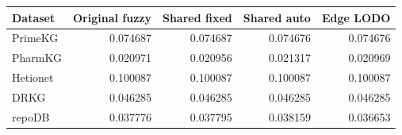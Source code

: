 \begin{tabular}{lrrrr}
\toprule
Dataset & Original fuzzy & Shared fixed & Shared auto & Edge LODO \\
\midrule
PrimeKG & 0.074687 & 0.074687 & 0.074676 & 0.074676 \\
PharmKG & 0.020971 & 0.020956 & 0.021317 & 0.020969 \\
Hetionet & 0.100087 & 0.100087 & 0.100087 & 0.100087 \\
DRKG & 0.046285 & 0.046285 & 0.046285 & 0.046285 \\
repoDB & 0.037776 & 0.037795 & 0.038159 & 0.036653 \\
\bottomrule
\end{tabular}
